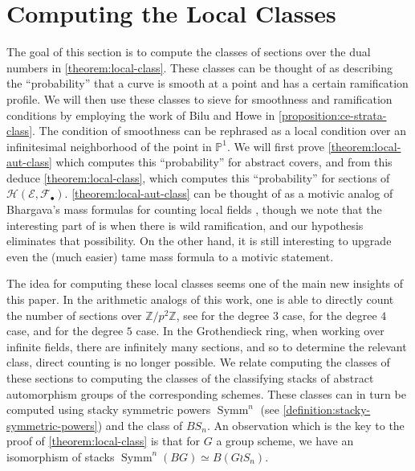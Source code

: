 \documentclass[12 pt]{amsart}
\theoremstyle{plain}
\theoremstyle{definition}
\theoremstyle{remark}
\numberwithin{equation}{section}
\newcommand\bp{\mathbb P}
\newcommand\bz{\mathbb Z}
\newcommand\sce{\mathscr E}
\newcommand\scf{\mathscr F}
\newcommand\sch{\mathscr H}
\DeclareMathOperator\symm{Symm}
\begin{document}
\section{Computing the Local Classes} \label{section:local-class}

The goal of this section is to compute the classes of sections over the dual
numbers in \autoref{theorem:local-class}. 
These classes
can be thought of as describing the ``probability'' that a curve is smooth at a
point and has a certain ramification profile.
We will then use these classes to sieve for smoothness and ramification
conditions by employing the work of Bilu and Howe
\cite{biluH:motivic-euler-products-in-motivic-statistics}
in \autoref{proposition:ce-strata-class}.
The condition of smoothness can be rephrased as a local condition over an
infinitesimal neighborhood of the point in $\bp^1$.
We will first prove \autoref{theorem:local-aut-class} which computes this
``probability'' for abstract covers,
and from this deduce \autoref{theorem:local-class}, which
computes this ``probability'' for sections of $\sch(\sce, \scf_\bullet)$.
 \autoref{theorem:local-aut-class} can be thought of as a motivic analog of Bhargava's mass formulas for counting local fields \cite{Bhargava2010}, though we note that the interesting part of \cite{Bhargava2010} is when there is wild ramification, and our hypothesis eliminates that possibility.  On the other hand, it is still interesting to upgrade even the (much easier) tame mass formula to a motivic statement.


The idea for computing these local classes seems one of the main
new insights of this paper.
In the arithmetic analogs of this work, one is able to directly count
the number of sections over $\bz/p^2\bz$, see
\cite[Lem.\ 18]{Bhargava2013b} for the degree 3 case,
\cite[Lem.\ 23]{Bhargava2004b} for the degree $4$ case,
and \cite[Lem.\ 20]{Bhargava2008a} for the degree $5$ case.
In the Grothendieck ring, when working over infinite fields, 
there are infinitely many sections, and so to
determine the relevant class, direct counting is no longer possible.
We relate computing the classes of these sections to computing the classes of
the classifying stacks of abstract automorphism groups of the corresponding schemes.
These classes can in turn be computed using stacky symmetric powers $\symm^n$
(see \autoref{definition:stacky-symmetric-powers})
and the
class of $BS_n$.
An observation
which is the key to the proof of \autoref{theorem:local-class} is that for $G$
a group scheme, we have an isomorphism of stacks $\symm^n (BG) \simeq B(G \wr
S_n)$.
\end{document}
